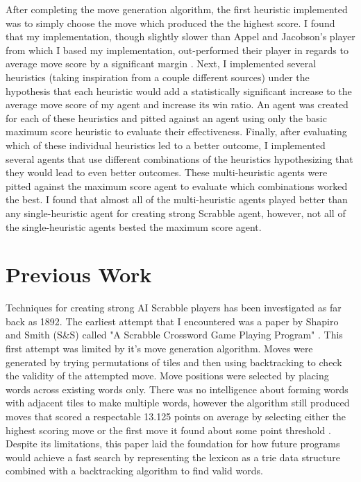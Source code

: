 \documentclass[letterpaper]{article}
\begin{document}
After completing the move generation algorithm, the first heuristic implemented was to simply choose the move which produced the the highest score. I found that my implementation, though slightly slower than Appel and Jacobson's player from which I based my implementation, out-performed their player in regards to average move score by a significant margin \cite{Appel1988}. Next, I implemented several heuristics (taking inspiration from a couple different sources) under the hypothesis that each heuristic would add a statistically significant increase to the average move score of my agent and increase its win ratio. An agent was created for each of these heuristics and pitted against an agent using only the basic maximum score heuristic to evaluate their effectiveness. Finally, after evaluating which of these individual heuristics led to a better outcome, I implemented several agents that use different combinations of the heuristics hypothesizing that they would lead to even better outcomes. These multi-heuristic agents were pitted against the maximum score agent to evaluate which combinations worked the best. I found that almost all of the multi-heuristic agents played better than any single-heuristic agent for creating strong Scrabble agent, however, not all of the single-heuristic agents bested the maximum score agent.

\section{Previous Work}
Techniques for creating strong AI Scrabble players has been investigated as far back as 1892. The earliest attempt that I encountered was a paper by Shapiro and Smith (S\&S) called "A Scrabble Crossword Game Playing Program" \cite{Shapiro1982}. This first attempt was limited by it's move generation algorithm. Moves were generated by trying permutations of tiles and then using backtracking to check the validity of the attempted move. Move positions were selected by placing words across existing words only. There was no intelligence about forming words with adjacent tiles to make multiple words, however the algorithm still produced moves that scored a respectable 13.125 points on average by selecting either the highest scoring move or the first move it found about some point threshold \cite{Shapiro1982}. Despite its limitations, this paper laid the foundation for how future programs would achieve a fast search by representing the lexicon as a trie data structure combined with a backtracking algorithm to find valid words.
\end{document}
